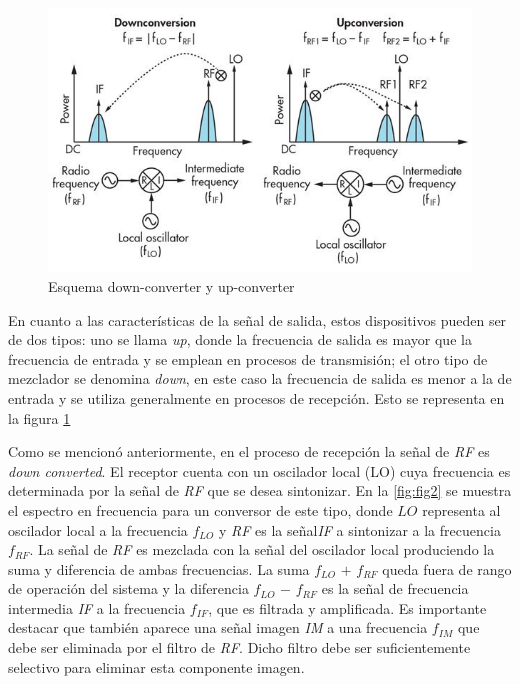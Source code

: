 \documentclass[twocolumn]{article}
\begin{document}
\begin{figure}[!ht]
  \centering    
	\includegraphics[scale=0.4]{imagenes/fig1.jpg}
	\caption{Esquema down-converter y up-converter}\label{fig:fig1}
\end{figure}

En cuanto a las características de la señal de salida, estos dispositivos pueden ser de dos tipos: uno se llama \textit{up}, donde la frecuencia de salida es mayor que la frecuencia de entrada y se emplean en procesos de transmisión; el otro tipo de mezclador se denomina \textit{down}, en este caso la frecuencia de salida es menor a la de entrada y se utiliza generalmente en procesos de recepción. Esto se representa en la figura \textcolor{blue}{\ref{fig:fig1}}

Como se mencionó anteriormente, en el proceso de recepción la señal de \textit{RF} es \textit{down converted}. El receptor cuenta con un oscilador local (LO) cuya frecuencia es determinada por la señal de \textit{RF} que se desea sintonizar. En la \textcolor{blue}{\ref{fig:fig2}} se muestra el espectro en frecuencia para un conversor de este tipo, donde $LO$ representa al oscilador local a la frecuencia $f_{LO}$ y \textit{RF} es la señal\textit{IF} a sintonizar a la frecuencia $f_{RF}$. La señal de \textit{RF} es mezclada con la señal del oscilador local produciendo la suma y diferencia de ambas frecuencias. La suma $f_{LO}$ $+$ $f_{RF}$ queda fuera de rango de operación del sistema y la diferencia $f_{LO}$ $-$ $f_{RF}$ es la señal de frecuencia intermedia \textit{IF} a la frecuencia $f_{IF}$, que es filtrada y amplificada. Es importante destacar que también aparece una señal imagen \textit{IM} a una frecuencia $f_{IM}$ que debe ser eliminada por el filtro de \textit{RF}. Dicho filtro debe ser suficientemente selectivo para eliminar esta componente imagen.
\end{document}
